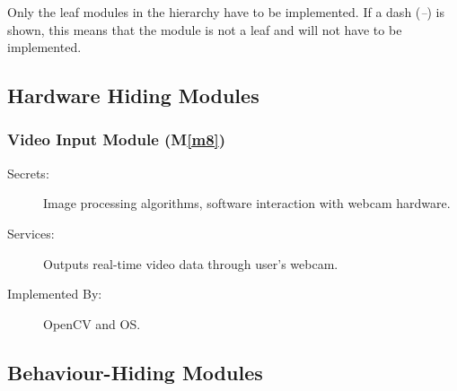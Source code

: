 \documentclass[12pt, titlepage]{article}
\newcommand{\mref}[1]{M\ref{#1}}
\begin{document}
Only the leaf modules in the hierarchy have to be implemented. If a dash
(\emph{--}) is shown, this means that the module is not a leaf and will not have
to be implemented.

\subsection{Hardware Hiding Modules}


\subsubsection{Video Input Module (\mref{m8})}
\begin{description}
\item[Secrets:] Image processing algorithms, software interaction with webcam hardware.
\item[Services:] Outputs real-time video data through user's webcam.
\item[Implemented By:] OpenCV and OS.
\end{description}

\subsection{Behaviour-Hiding Modules}

\end{document}
